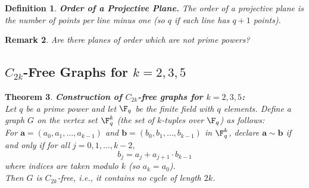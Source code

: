 \documentclass[a4paper]{article}
\newtheorem{thm}{Theorem}[section]
\newtheorem{defn}[thm]{Definition}
\newtheorem{rmk}[thm]{Remark}
\begin{document}
\begin{defn}
    \textbf{Order of a Projective Plane.} The order of a projective plane is the number of points per line minus one (so $q$ if each line has $q+1$ points).
\end{defn}

\begin{rmk}
    Are there planes of order which are not prime powers?
\end{rmk}

\subsection{$C_{2k}$-Free Graphs for $k=2,3,5$}

\begin{thm}
    \textbf{Construction of $C_{2k}$-free graphs for $k=2,3,5$:}\\
    Let $q$ be a prime power and let $\F_q$ be the finite field with $q$ elements. Define a graph $G$ on the vertex set $\F_q^k$ (the set of $k$-tuples over $\F_q$) as follows:\\
    For $\mathbf{a} = (a_0, a_1, \ldots, a_{k-1})$ and $\mathbf{b} = (b_0, b_1, \ldots, b_{k-1})$ in $\F_q^k$, declare $\mathbf{a} \sim \mathbf{b}$ if and only if for all $j = 0, 1, \ldots, k-2$,
    \[
        b_j = a_j + a_{j+1} \cdot b_{k-1}
    \]
    where indices are taken modulo $k$ (so $a_k = a_0$).\\
    Then $G$ is $C_{2k}$-free, i.e., it contains no cycle of length $2k$.
\end{thm}
\end{document}
